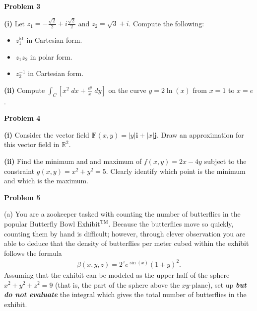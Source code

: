 \documentclass[12pt]{amsbook}
\newcommand{\DD}{\displaystyle}
\begin{document}
\newpage

\textbf{Problem 3}

\vspace{.25cm}

\textbf{(i)} Let $z_1 = -\frac{\sqrt{2}}{2} + i\frac{\sqrt{2}}{2}$ and $z_2 = \sqrt{3} + i$. Compute the following:
\begin{itemize}
\item[(a)] $z_1^{51}$ in Cartesian form.
\item[(b)] $z_1 z_2$ in polar form.
\item[(c)] $z_2^{-1}$ in Cartesian form.
\end{itemize}


\vspace{7cm}

\textbf{(ii)} Compute $\DD \int_C \left[x^2 \; dx + \frac{e^y}{x} \; dy\right]$ on the curve $y = 2\ln(x)$ from $x=1$ to $x = e$.




\newpage

\textbf{Problem 4}

\vspace{.25cm}

\textbf{(i)} Consider the vector field $\textbf{F}(x,y) = |y|\textbf{i} + |x|\textbf{j}$. Draw an approximation for this vector field in $\mathbb{R}^2$.


\vspace{8cm}

\textbf{(ii)} Find the minimum and and maximum of $f(x,y) = 2x-4y$ subject to the constraint $g(x,y) = x^2+y^2 = 5$. Clearly identify which point is the minimum and which is the maximum.









\newpage

\textbf{Problem 5}

\vspace{.25cm}



(a) You are a zookeeper tasked with counting the number of butterflies in the popular $\text{Butterfly Bowl Exhibit}^{\text{TM}}$. Because the butterflies move so quickly, counting them by hand is difficult; however, through clever observation you are able to deduce that the density of butterflies per meter cubed within the exhibit follows the formula
\begin{align*}
\beta(x,y,z) = 2^ze^{\sin(x)}(1+y)^2.
\end{align*}
Assuming that the exhibit can be modeled as the upper half of the sphere $x^2+y^2+z^2 = 9$ (that is, the part of the sphere above the $xy$-plane), set up \emph{\textbf{but do not evaluate}} the integral which gives the total number of butterflies in the exhibit.
\end{document}
